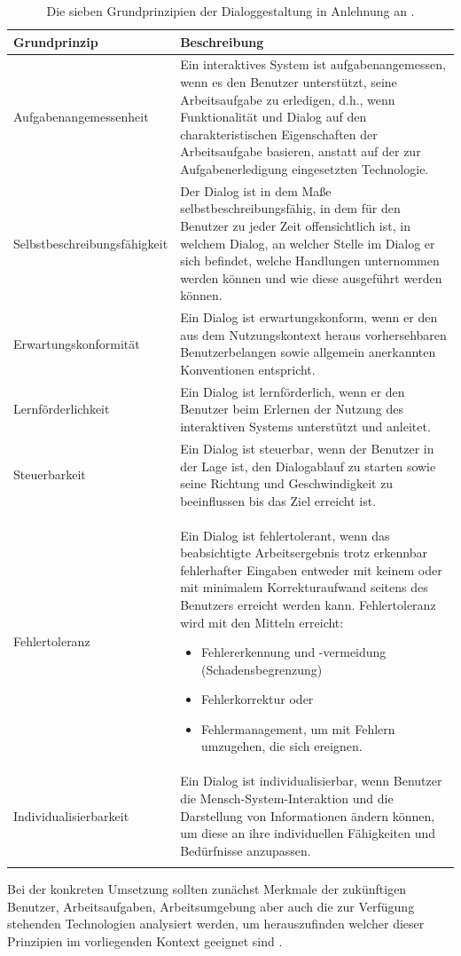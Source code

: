 \begin{center}
\begin{longtable}{|p{5.1cm}|p{9.5cm}|} 
\hline
\textbf{Grundprinzip} & \textbf{Beschreibung} \\ \hline
Aufgabenangemessenheit & Ein interaktives System ist aufgabenangemessen, wenn es den Benutzer unterstützt, seine Arbeitsaufgabe zu erledigen, d.h., wenn Funktionalität und Dialog auf den charakteristischen Eigenschaften der Arbeitsaufgabe basieren, anstatt auf der zur Aufgabenerledigung eingesetzten Technologie. \\ \hline
Selbstbeschreibungsfähigkeit & Der Dialog ist in dem Maße selbstbeschreibungsfähig, in dem für den Benutzer zu jeder Zeit offensichtlich ist, in welchem Dialog, an welcher Stelle im Dialog er sich befindet, welche Handlungen unternommen werden können und wie diese ausgeführt werden können. \\ \hline
Erwartungskonformität & Ein Dialog ist erwartungskonform, wenn er den aus dem Nutzungskontext heraus vorhersehbaren Benutzerbelangen sowie allgemein anerkannten Konventionen entspricht. \\ \hline
Lernförderlichkeit & Ein Dialog ist lernförderlich, wenn er den Benutzer beim Erlernen der Nutzung des interaktiven Systems unterstützt und anleitet. \\ \hline
Steuerbarkeit & Ein Dialog ist steuerbar, wenn der Benutzer in der Lage ist, den Dialogablauf zu starten sowie seine Richtung und Geschwindigkeit zu beeinflussen bis das Ziel erreicht ist. \\ \hline
Fehlertoleranz & Ein Dialog ist fehlertolerant, wenn das beabsichtigte Arbeitsergebnis trotz erkennbar fehlerhafter Eingaben entweder mit keinem oder mit minimalem Korrekturaufwand seitens des Benutzers erreicht werden kann. Fehlertoleranz wird mit den Mitteln erreicht: 
\begin{itemize}\itemsep0pt
  \item Fehlererkennung und -vermeidung (Schadensbegrenzung)
  \item Fehlerkorrektur oder
  \item Fehlermanagement, um mit Fehlern umzugehen, die sich ereignen.
\end{itemize} \\ \hline
Individualisierbarkeit & Ein Dialog ist individualisierbar, wenn Benutzer die Mensch-System-Interaktion und die Darstellung von Informationen ändern können, um diese an ihre individuellen Fähigkeiten und Bedürfnisse anzupassen.\\ \hline
\caption{Die sieben Grundprinzipien der Dialoggestaltung in Anlehnung an \citep[]{ISO9241-110}.}
\label{tab:siebenGrundprinzipien}
\end{longtable}
\end{center}
Bei der konkreten Umsetzung sollten zunächst Merkmale der zukünftigen Benutzer, Arbeitsaufgaben, Arbeitsumgebung aber auch die zur Verfügung stehenden Technologien analysiert werden, um herauszufinden welcher dieser Prinzipien im vorliegenden Kontext geeignet sind \citep[vgl.][]{Figl2010}. 

